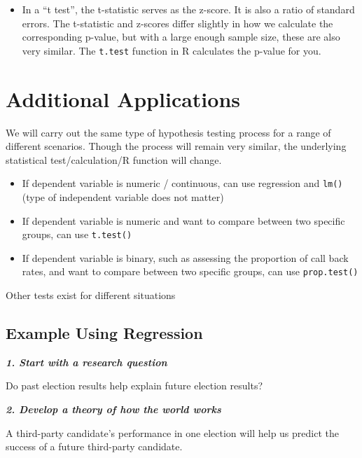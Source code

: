 \documentclass[
  letterpaper,
  DIV=11,
  numbers=noendperiod]{scrreprt}
\providecommand{\tightlist}{%
  \setlength{\itemsep}{0pt}\setlength{\parskip}{0pt}}\usepackage{longtable,booktabs,array}
\begin{document}
\begin{itemize}
\tightlist
\item
  In a ``t test'', the t-statistic serves as the z-score. It is also a
  ratio of standard errors. The t-statistic and z-scores differ slightly
  in how we calculate the corresponding p-value, but with a large enough
  sample size, these are also very similar. The \texttt{t.test} function
  in R calculates the p-value for you.
\end{itemize}

\hypertarget{additional-applications}{%
\section{Additional Applications}\label{additional-applications}}

We will carry out the same type of hypothesis testing process for a
range of different scenarios. Though the process will remain very
similar, the underlying statistical test/calculation/R function will
change.

\begin{itemize}
\tightlist
\item
  If dependent variable is numeric / continuous, can use regression and
  \texttt{lm()} (type of independent variable does not matter)
\item
  If dependent variable is numeric and want to compare between two
  specific groups, can use \texttt{t.test()}
\item
  If dependent variable is binary, such as assessing the proportion of
  call back rates, and want to compare between two specific groups, can
  use \texttt{prop.test()}
\end{itemize}

Other tests exist for different situations

\hypertarget{example-using-regression}{%
\subsection{Example Using Regression}\label{example-using-regression}}

\textbf{\emph{1. Start with a research question}}

Do past election results help explain future election results?

\textbf{\emph{2. Develop a theory of how the world works}}

A third-party candidate's performance in one election will help us
predict the success of a future third-party candidate.
\end{document}
